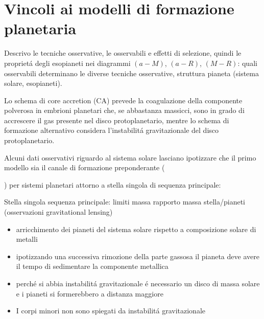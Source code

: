 \documentclass[twoside,11pt,fleqn]{memoir}%
\begin{document}
{\let\clearpage\relax\let\cleardoublepage\relax
\part{Vincoli ai modelli di formazione planetaria}
}
\begin{workout}
Descrivo le tecniche osservative, le osservabili e effetti di selezione, quindi le propriet\'a degli esopianeti nei diagrammi $(a-M)$, $(a-R)$, $(M-R)$: quali osservabili determinano le diverse tecniche osservative, struttura pianeta (sistema solare, esopianeti).
\end{workout}
Lo schema di core accretion (CA) prevede la coagulazione della componente polverosa in embrioni planetari che, se abbastanza massicci, sono in grado di accrescere il gas presente nel disco protoplanetario, mentre lo schema di formazione alternativo considera l'instabilit\'a gravitazionale del disco protoplanetario.

Alcuni dati osservativi riguardo al sistema solare lasciano ipotizzare che il primo modello sia il canale di formazione preponderante (\begin{workout}\end{workout}) per sistemi planetari attorno a stella singola di sequenza principale:
\begin{workout}{Stella singola sequenza principale: limiti massa}
rapporto massa stella/pianeti (osservazioni gravitational lensing)
\end{workout}
\begin{itemize}
\item arricchimento dei pianeti del sistema solare rispetto a composizione solare di metalli%
\item ipotizzando una successiva rimozione della parte gassosa il pianeta deve avere il tempo di sedimentare la componente metallica
\item perch\'e si abbia instabilit\'a gravitazionale \'e necessario un disco di massa solare e i pianeti si formerebbero a distanza maggiore
\item I corpi minori non sono spiegati da instabilit\'a gravitazionale
\end{itemize}


\cleartorecto
\end{document}
